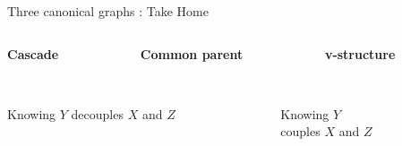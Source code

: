 \documentclass[10pt]{beamer}
\begin{document}
\begin{frame}{Three canonical graphs : Take Home}


\begin{columns}[onlytextwidth,t]
 \begin{column}{0.33\textwidth}
  \centering
    \textbf{Cascade} \\[.3cm]
		   \\[.3cm]
    \end{column}
    
 \begin{column}{0.33\textwidth}
  \centering
    \textbf{Common parent} \\[.3cm]
		  \\[.3cm] 
    \end{column}
    
 \begin{column}{0.33\textwidth}
  \centering
    \textbf{v-structure} \\[.3cm]
		   \\[.3cm]
    \end{column}
    
\end{columns}

\vfill
\begin{columns}
 \begin{column}{0.67\textwidth}
 \centering
 Knowing $Y$ \alert{decouples} $X$ and $Z$
    \end{column}
  
   \begin{column}{0.33\textwidth}
   \centering
 Knowing $Y$ \\  \alert{couples} $X$ and $Z$
    \end{column}
    
 \end{columns}
 \end{frame}
 
 
 
\end{document}
